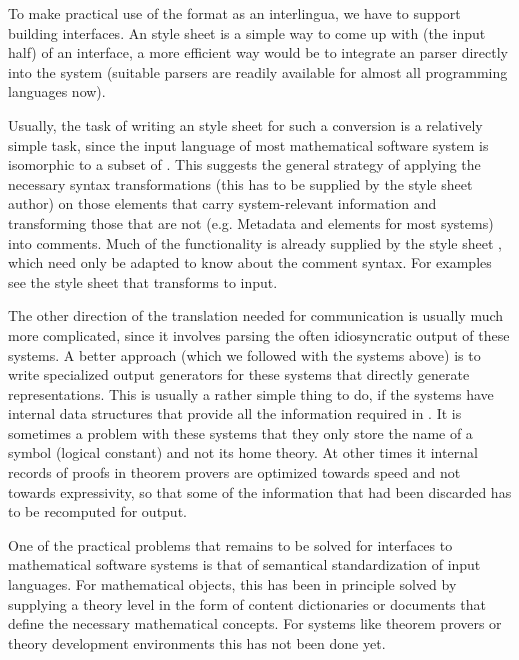 To make practical use of the {\omdoc} format as an interlingua, we have to support
building {\omdoc} interfaces. An {\xslt} style sheet is a simple way to come up
with (the input half) of an {\omdoc} interface, a more efficient way would be to
integrate an {\xml} parser directly
into the system (suitable {\xml} parsers are readily available for almost all
programming languages now).

Usually, the task of writing an {\xslt} style sheet for such a conversion is a
relatively simple task, since the input language of most mathematical software
system is isomorphic to a subset of {\omdoc}. This suggests the general strategy
of applying the necessary syntax transformations (this has to be supplied by the
style sheet author) on those {\omdoc} elements that carry system-relevant
information and transforming those that are not (e.g. Metadata and {}
elements for most systems) into comments.  Much of the functionality is already
supplied by the style sheet {}, which need only be adapted to
know about the comment syntax. For examples see the {} style
sheet that transforms {\omdoc} to {\pvs} input.

The other direction of the translation needed for communication is
usually much more complicated, since it involves parsing the often
idiosyncratic output of these systems. A better approach (which we
followed with the systems above) is to write specialized output
generators for these systems that directly generate {\omdoc}
representations. This is usually a rather simple thing to do, if the
systems have internal data structures that provide all the information
required in {\omdoc}. It is sometimes a problem with these systems
that they only store the name of a symbol (logical constant) and not
its home theory. At other times it internal records of proofs in
theorem provers are optimized towards speed and not towards
expressivity, so that some of the information that had been discarded
has to be recomputed for {\omdoc} output.

One of the practical problems that remains to be solved for interfaces to
mathematical software systems is that of semantical standardization of input
languages. For mathematical objects, this has been in principle solved by
supplying a theory level in the form of {\openmath} content dictionaries or
{\omdoc} documents that define the necessary mathematical concepts. For systems
like theorem provers or theory development environments this has not been done
yet. 

